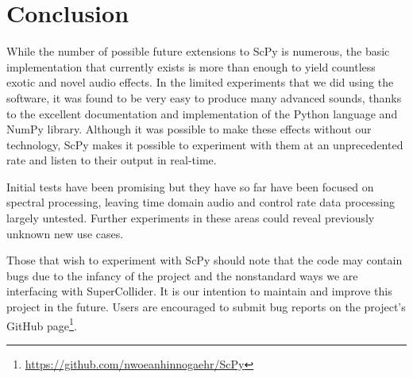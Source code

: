 \documentclass{article}
\begin{document}
\section{Conclusion}

While the number of possible future extensions to ScPy is numerous, the basic implementation that
currently exists is more than enough to yield countless exotic and novel audio effects. In the
limited experiments that we did using the software, it was found to be very easy to produce many
advanced sounds, thanks to the excellent documentation and implementation of the Python language
and NumPy library. Although it was possible to make these effects without our technology, ScPy
makes it possible to experiment with them at an unprecedented rate and listen to their output in
real-time.

Initial tests have been promising but they have so far have been focused on spectral processing,
leaving time domain audio and control rate data processing largely untested. Further experiments in
these areas could reveal previously unknown new use cases.

Those that wish to experiment with ScPy should note that the code may contain bugs due to the
infancy of the project and the nonstandard ways we are interfacing with SuperCollider. It is our
intention to maintain and improve this project in the future. Users are encouraged to submit bug
reports on the project's GitHub page\footnote{\url{https://github.com/nwoeanhinnogaehr/ScPy}}.

\printbibliography{}
\end{document}
